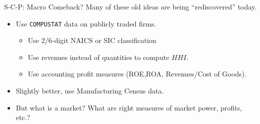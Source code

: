 \begin{frame}{S-C-P: Macro Comeback?}
Many of these old ideas are being ``rediscovered'' today.
\begin{itemize}
\item Use \texttt{COMPUSTAT} data on publicly traded firms.
\begin{itemize}
\item Use 2/6-digit NAICS or SIC classification
\item Use revenues instead of quantities to compute $HHI$.
\item Use accounting profit measures (ROE,ROA, Revenues/Cost of Goods).
\end{itemize}
\item Slightly better, use Manufacturing Census data.
\item But what is a market? What are right measures of market power, profits, etc.?
\end{itemize}
\end{frame}

















































